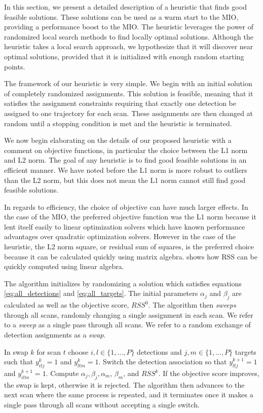 In this section, we present a detailed description of a heuristic that finds good feasible solutions. These solutions can be used as a warm start to the MIO, providing a performance boost to the MIO. The heuristic leverages the power of randomized local search methods to find locally optimal solutions. Although the heuristic takes a local search approach, we hypothesize that it will discover near optimal solutions, provided that it is initialized with enough random starting points. 

The framework of our heuristic is very simple. We begin with an initial solution of completely randomized assignments. This solution is feasible, meaning that it satisfies the assignment constraints requiring that exactly one detection be assigned to one trajectory for each scan. These assignments are then changed at random until a stopping condition is met and the heuristic is terminated. 

We now begin elaborating on the details of our proposed heuristic with a comment on objective functions, in particular the choice between the L1 norm and L2 norm. The goal of any heuristic is to find good feasible solutions in an efficient manner. We have noted before the L1 norm is more robust to outliers than the L2 norm, but this does not mean the L1 norm cannot still find good feasible solutions. 

In regards to efficiency, the choice of objective can have much larger effects. In the case of the MIO, the preferred objective function was the L1 norm because it lent itself easily to linear optimization solvers which have known performance advantages over quadratic optimization solvers. However in the case of the heuristic, the L2 norm square, or residual sum of squares, is the preferred choice because it can be calculated quickly using matrix algebra. \cite{RSS-Matrix} shows how RSS can be quickly computed using linear algebra.

The algorithm initializes by randomizing a solution which satisfies equations \eqref{eq:all_detections} and \eqref{eq:all_targets}. The initial parameters $\alpha_{j}$ and $\beta_{j}$ are calculated as well as the objective score, $RSS^{0}$. The algorithm then \textit{sweeps} through all scans, randomly changing a single assignment in each scan. We refer to a \textit{sweep} as a single pass through all scans. We refer to a random exchange of detection assignments as a \textit{swap}.

In swap $k$ for scan $t$ choose $i,l\in \{1,\ldots,P\}$ detections and $j,m\in\{1,\ldots,P\}$ targets such that $y^k_{itj}=1$ and $y^k_{ltm}=1$. Switch the detection association so that $y^{k+1}_{ltj}=1$ and $y^{k+1}_{itm}=1$. Compute $\alpha_{j}, \beta_{j}, \alpha_{m}$, $\beta_{m}$, and $RSS^{k}$. If the objective score improves, the swap is kept, otherwise it is rejected. The algorithm then advances to the next scan where the same process is repeated, and it terminates once it makes a single pass through all scans without accepting a single switch. 

